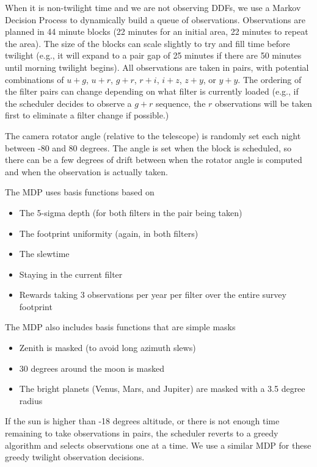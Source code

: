 When it is non-twilight time and we are not observing DDFs, we use a Markov Decision Process to dynamically build a queue of observations.  Observations are planned in 44 minute blocks (22 minutes for an initial area, 22 minutes to repeat the area). The size of the blocks can scale slightly to try and fill time before twilight (e.g., it will expand to a pair gap of 25 minutes if there are 50 minutes until morning twilight begins). All observations are taken in pairs, with potential combinations of $u+g$, $u+r$, $g+r$, $r+i$, $i+z$, $z+y$, or $y+y$. The ordering of the filter pairs can change depending on what filter is currently loaded (e.g., if the scheduler decides to observe a $g+r$ sequence, the $r$ observations will be taken first to eliminate a filter change if possible.)

The camera rotator angle (relative to the telescope) is randomly set each night between -80 and 80 degrees. The angle is set when the block is scheduled, so there can be a few degrees of drift between when the rotator angle is computed and when the observation is actually taken.

The MDP uses basis functions based on
\begin{itemize}
    \item{The 5-sigma depth (for both filters in the pair being taken)}
    \item{The footprint uniformity (again, in both filters)}
    \item{The slewtime}
    \item{Staying in the current filter}
    \item{Rewards taking 3 observations per year per filter over the entire survey footprint} 
\end{itemize}
The MDP also includes basis functions that are simple masks
\begin{itemize}
    \item{Zenith is masked (to avoid long azimuth slews)}
    \item{30 degrees around the moon is masked}
    \item{The bright planets (Venus, Mars, and Jupiter) are masked with a 3.5 degree radius}
\end{itemize}


If the sun is higher than -18 degrees altitude, or there is not enough time remaining to take observations in pairs, the scheduler reverts to a greedy algorithm and selects observations one at a time. We use a similar MDP for these greedy twilight observation decisions. 

